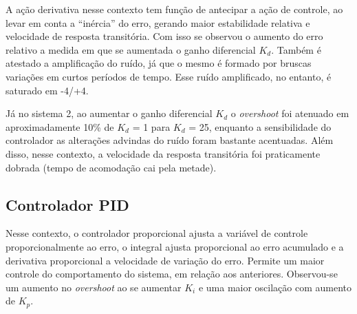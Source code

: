 \begin{figure}[h]
\end{figure}

A ação derivativa nesse contexto tem função de antecipar a ação de controle, ao levar em conta a “inércia” do erro, gerando maior estabilidade relativa e velocidade de resposta transitória. Com isso se observou o aumento do erro relativo a medida em que se aumentada o ganho diferencial $K_d$. Também é atestado a amplificação do ruído, já que o mesmo é formado por bruscas variações em curtos períodos de tempo. Esse ruído amplificado, no entanto, é saturado em -4/+4.

Já no sistema 2, ao aumentar o ganho diferencial $K_d$ o \emph{overshoot} foi atenuado em aproximadamente 10\% de $K_d$ = 1 para $K_d$ = 25, enquanto a sensibilidade do controlador as alterações advindas do ruído foram bastante acentuadas. Além disso, nesse contexto, a velocidade da resposta transitória foi praticamente dobrada (tempo de acomodação cai pela metade).


\newpage

\subsection{Controlador PID}\hspace{4ex}
\begin{figure}[h]
\end{figure}

Nesse contexto, o controlador proporcional ajusta a variável de controle proporcionalmente ao erro, o integral ajusta proporcional ao erro acumulado e a derivativa proporcional a velocidade de variação do erro. Permite um maior controle do comportamento do sistema, em relação aos anteriores. Observou-se um aumento no \emph{overshoot} ao se aumentar $K_i$ e uma maior oscilação com aumento de $K_p$.

